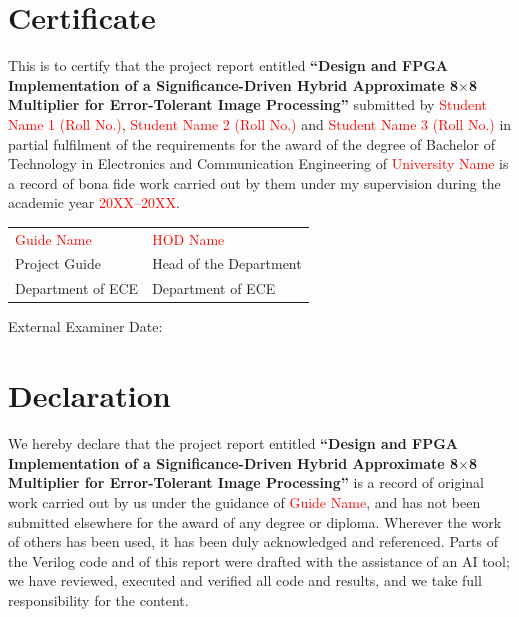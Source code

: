 \documentclass[12pt,a4paper,oneside]{report}
\newcommand{\placeholder}[1]{\textcolor{red}{#1}}
\begin{document}
\chapter*{Certificate}
This is to certify that the project report entitled \textbf{``Design and FPGA Implementation of a Significance-Driven Hybrid Approximate 8$\times$8 Multiplier for Error-Tolerant Image Processing''} submitted by \placeholder{Student Name 1 (Roll No.)}, \placeholder{Student Name 2 (Roll No.)} and \placeholder{Student Name 3 (Roll No.)} in partial fulfilment of the requirements for the award of the degree of Bachelor of Technology in Electronics and Communication Engineering of \placeholder{University Name} is a record of bona fide work carried out by them under my supervision during the academic year \placeholder{20XX--20XX}.

\vspace{2.5cm}
\noindent
\begin{tabular}{@{}p{}p{}@{}}
\placeholder{Guide Name} & \placeholder{HOD Name} \\
Project Guide & Head of the Department \\
Department of ECE & Department of ECE \\
\end{tabular}

\vspace{2cm}
\noindent External Examiner \hfill Date: \underline{\hspace{3cm}}

\chapter*{Declaration}
We hereby declare that the project report entitled \textbf{``Design and FPGA Implementation of a Significance-Driven Hybrid Approximate 8$\times$8 Multiplier for Error-Tolerant Image Processing''} is a record of original work carried out by us under the guidance of \placeholder{Guide Name}, and has not been submitted elsewhere for the award of any degree or diploma. Wherever the work of others has been used, it has been duly acknowledged and referenced. Parts of the Verilog code and of this report were drafted with the assistance of an AI tool; we have reviewed, executed and verified all code and results, and we take full responsibility for the content.
\end{document}
